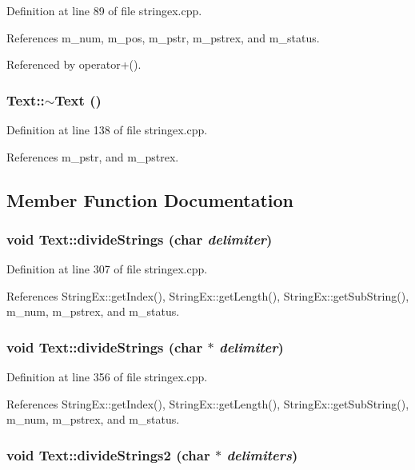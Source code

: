 Definition at line 89 of file stringex.cpp.

References m\_\-num, m\_\-pos, m\_\-pstr, m\_\-pstrex, and m\_\-status.

Referenced by operator+().\hypertarget{classText_2d49e5c280e205125b149f7777ae30c7}{
\subsubsection[{$\sim$Text}]{\setlength{\rightskip}{0pt plus 5cm}Text::$\sim$Text ()}}
\label{classText_2d49e5c280e205125b149f7777ae30c7}




Definition at line 138 of file stringex.cpp.

References m\_\-pstr, and m\_\-pstrex.

\subsection{Member Function Documentation}
\hypertarget{classText_fe6e02880ca0687b7706dec9641b802c}{
\subsubsection[{divideStrings}]{\setlength{\rightskip}{0pt plus 5cm}void Text::divideStrings (char {\em delimiter})}}
\label{classText_fe6e02880ca0687b7706dec9641b802c}




Definition at line 307 of file stringex.cpp.

References StringEx::getIndex(), StringEx::getLength(), StringEx::getSubString(), m\_\-num, m\_\-pstrex, and m\_\-status.\hypertarget{classText_20e3bcacb767a6a20bf9b727b6333cc5}{
\subsubsection[{divideStrings}]{\setlength{\rightskip}{0pt plus 5cm}void Text::divideStrings (char $\ast$ {\em delimiter})}}
\label{classText_20e3bcacb767a6a20bf9b727b6333cc5}




Definition at line 356 of file stringex.cpp.

References StringEx::getIndex(), StringEx::getLength(), StringEx::getSubString(), m\_\-num, m\_\-pstrex, and m\_\-status.\hypertarget{classText_7ab326bd81ec7440aac9427b6991ab8b}{
\subsubsection[{divideStrings2}]{\setlength{\rightskip}{0pt plus 5cm}void Text::divideStrings2 (char $\ast$ {\em delimiters})}}
\label{classText_7ab326bd81ec7440aac9427b6991ab8b}




